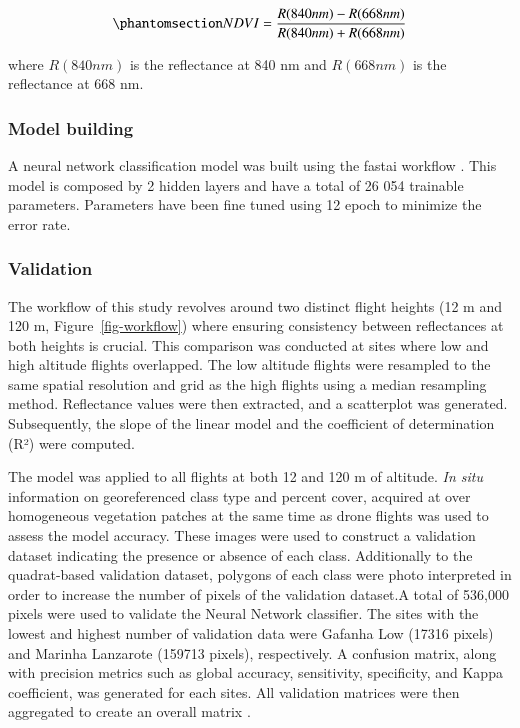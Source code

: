 \documentclass[
  number]{elsarticle}
\begin{document}
\begin{equation}\phantomsection\label{eq-ndvi}{
NDVI = \frac{R(840nm)-R(668nm)}{R(840nm)+R(668nm)}
}\end{equation}

where \(R(840nm)\) is the reflectance at 840 nm and \(R(668nm)\) is the
reflectance at 668 nm.

\subsubsection{Model building}\label{model-building}

A neural network classification model was built using the fastai
workflow \citep{howard2018fastai}. This model is composed by 2 hidden
layers and have a total of 26 054 trainable parameters. Parameters have
been fine tuned using 12 epoch to minimize the error rate.

\subsubsection{Validation}\label{validation}

The workflow of this study revolves around two distinct flight heights
(12 m and 120 m, Figure~\ref{fig-workflow}) where ensuring consistency
between reflectances at both heights is crucial. This comparison was
conducted at sites where low and high altitude flights overlapped. The
low altitude flights were resampled to the same spatial resolution and
grid as the high flights using a median resampling method. Reflectance
values were then extracted, and a scatterplot was generated.
Subsequently, the slope of the linear model and the coefficient of
determination (R²) were computed.

The model was applied to all flights at both 12 and 120 m of altitude.
\emph{In situ} information on georeferenced class type and percent
cover, acquired at over homogeneous vegetation patches at the same time
as drone flights was used to assess the model accuracy. These images
were used to construct a validation dataset indicating the presence or
absence of each class. Additionally to the quadrat-based validation
dataset, polygons of each class were photo interpreted in order to
increase the number of pixels of the validation dataset.A total of
536,000 pixels were used to validate the Neural Network classifier. The
sites with the lowest and highest number of validation data were Gafanha
Low (17316 pixels) and Marinha Lanzarote (159713 pixels), respectively.
A confusion matrix, along with precision metrics such as global
accuracy, sensitivity, specificity, and Kappa coefficient, was generated
for each sites. All validation matrices were then aggregated to create
an overall matrix .
\end{document}

